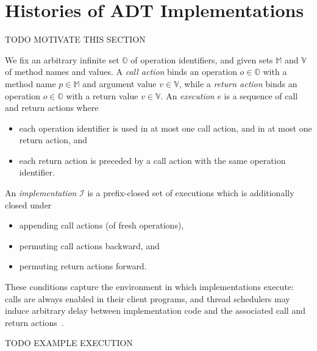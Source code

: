 \section{Histories of ADT Implementations}
\label{sec:histories}

TODO MOTIVATE THIS SECTION

We fix an arbitrary infinite set $\mathbb{O}$ of operation identifiers, and
given sets $\mathbb{M}$ and $\mathbb{V}$ of method names and values. A
\emph{call action} binds an operation $o \in \mathbb{O}$ with a method name $p
\in \mathbb{M}$ and argument value $v \in \mathbb{V}$, while a \emph{return
action} binds an operation $o \in \mathbb{O}$ with a return value $v \in
\mathbb{V}$. An \emph{execution} $e$ is a sequence of call and return actions
where
\begin{itemize}

  \item each operation identifier is used in at most one call action, and in at
  most one return action, and

  \item each return action is preceded by a call action with the same operation
  identifier.

\end{itemize}
An \emph{implementation} $\mathcal{I}$ is a prefix-closed set of executions
which is additionally closed under
\begin{itemize}

  \item appending call actions (of fresh operations),

  \item permuting call actions backward, and

  \item permuting return actions forward.

\end{itemize}
These conditions capture the environment in which implementations execute:
calls are always enabled in their client programs, and thread schedulers may
induce arbitrary delay between implementation code and the associated call and
return actions~\cite{conf/popl/BouajjaniEEH15}.

\begin{example}

  TODO EXAMPLE EXECUTION

\end{example}

